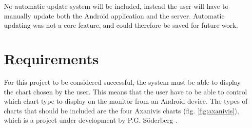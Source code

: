 \documentclass[12pt,a4paper,notitlepage]{report}
\begin{document}
No automatic update system will be included, instead the user will have to manually update both the Android application and the server. Automatic updating was not a core feature, and could therefore be saved for future work.

\section{Requirements}

For this project to be considered successful, the system must be able to display the chart chosen by the user. This means that the user have to be able to control which chart type to display on the monitor from an Android device. The types of charts that should be included are the four Axanivis charts (fig. \ref{fig:axanivis}), which is a project under development by P.G. Söderberg \cite{PGSoderbergOral}.
\end{document}
